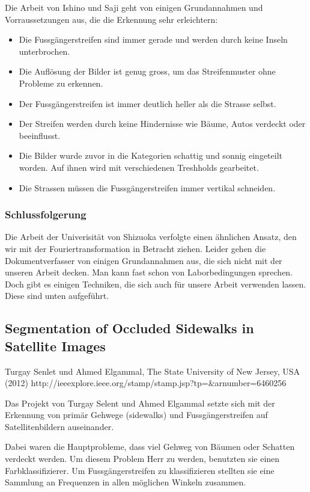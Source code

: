 Die Arbeit von Ishino und Saji geht von einigen Grundannahmen und Vorraussetzungen aus, die die Erkennung sehr erleichtern:

\begin{itemize}
	\item Die Fussgängerstreifen sind immer gerade und werden durch keine Inseln unterbrochen.
	\item Die Auflösung der Bilder ist genug gross, um das Streifenmuster ohne Probleme zu erkennen.
	\item Der Fussgängerstreifen ist immer deutlich heller als die Strasse selbst.
	\item Der Streifen werden durch keine Hindernisse wie Bäume, Autos verdeckt oder beeinflusst.
	\item Die Bilder wurde zuvor in die Kategorien schattig und sonnig eingeteilt worden. Auf ihnen wird mit verschiedenen Treshholds gearbeitet.
	\item Die Strassen müssen die Fussgängerstreifen immer vertikal schneiden.
\end{itemize}

\subsubsection{Schlussfolgerung}
Die Arbeit der Univerisität von Shizuoka verfolgte einen ähnlichen Ansatz, den wir mit der Fouriertransformation in Betracht ziehen. Leider gehen die Dokumentverfasser von einigen Grundannahmen aus, die sich nicht mit der unseren Arbeit decken. Man kann fast schon von Laborbedingungen sprechen.
Doch gibt es einigen Techniken, die sich auch für unsere Arbeit verwenden lassen. Diese sind unten aufgeführt.

\subsection{Segmentation of Occluded Sidewalks in Satellite Images}
Turgay Senlet und Ahmed Elgammal, The State University of New Jersey, USA (2012)
http://ieeexplore.ieee.org/stamp/stamp.jsp?tp=\&arnumber=6460256

Das Projekt von Turgay Selent und Ahmed Elgammal setzte sich mit der Erkennung von primär Gehwege (sidewalks) und Fussgängerstreifen auf Satellitenbildern auseinander.

Dabei waren die Hauptprobleme, dass viel Gehweg von Bäumen oder Schatten verdeckt werden. Um diesem Problem Herr zu werden, benutzten sie einen Farbklassifizierer.
Um Fussgängerstreifen zu klassifizieren stellten sie eine Sammlung an Frequenzen in allen möglichen Winkeln zusammen. 

